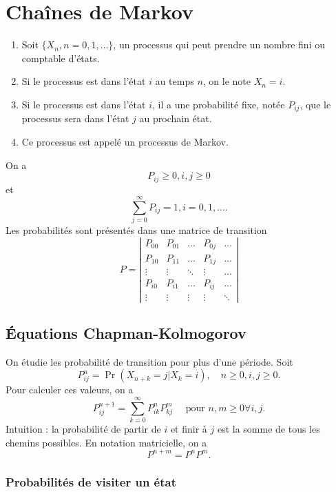 \chapter{Chaînes de Markov}

\begin{enumerate}
	\item Soit $\{X_n, n = 0, 1, \dots\}$, un processus qui peut prendre un nombre fini ou comptable d'états. 
	\item Si le processus est dans l'état $i$ au temps $n$, on le note $X_n = i$. 
	\item Si le processus est dans l'état $i$, il a une probabilité fixe, notée $P_{ij}$, que le processus sera dans l'état $j$ au prochain état. 
	\item Ce processus est appelé un processus de Markov. 
\end{enumerate}

On a $$P_{ij} \geq 0, i, j \geq 0$$
et
$$\sum_{j =0 }^{\infty} P_{ij} = 1, i = 0, 1, \dots .$$
Les probabilités sont présentés dans une matrice de transition
$$P = \left|\begin{array}{ccccc}
	P_{00} & P_{01} & \dots & P_{0j} & \dots \\
	P_{10} & P_{11} & \dots & P_{1j} & \dots \\
	\vdots & \vdots & \ddots & \vdots & \dots \\
	P_{i0} & P_{i1} & \dots & P_{ij} & \dots \\
	\vdots & \vdots & \vdots & \vdots & \ddots 
\end{array}\right|$$

\section{Équations Chapman-Kolmogorov}

On étudie les probabilité de transition pour plus d'une période. Soit 
$$P_{ij}^{n} = \Pr(X_{n+k} = j \vert X_k = i), \quad n\geq 0, i, j \geq 0.$$
Pour calculer ces valeurs, on a 
$$P_{ij}^{n+1} = \sum_{k = 0}^{\infty} P_{ik}^nP_{kj}^m \quad \text{ pour }n, m \geq 0 \forall i, j.$$
Intuition : la probabilité de partir de $i$ et finir à $j$ est la somme de tous les chemins possibles. En notation matricielle, on a 
$$P^{n+m} = P^n P^m.$$

\subsection{Probabilités de visiter un état}

